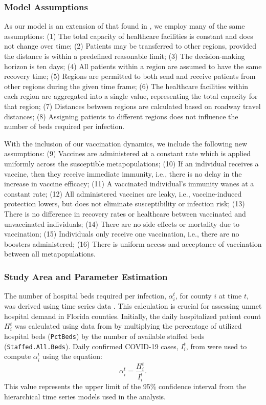 \documentclass{article}
\begin{document}
\subsubsection{Model Assumptions}
As our model is an extension of that found in \textcite{abazari2024allocation}, we employ many of the same assumptions: (1) The total capacity of healthcare facilities is constant and does not change over time; (2) Patients may be transferred to other regions, provided the distance is within a predefined reasonable limit; (3) The decision-making horizon is ten days; (4) All patients within a region are assumed to have the same recovery time; (5) Regions are permitted to both send and receive patients from other regions during the given time frame; (6) The healthcare facilities within each region are aggregated into a single value, representing the total capacity for that region; (7) Distances between regions are calculated based on roadway travel distances; (8) Assigning patients to different regions does not influence the number of beds required per infection.

With the inclusion of our vaccination dynamics, we include the following new assumptions: (9) Vaccines are administered at a constant rate which is applied uniformly across the susceptible metapopulations; (10) If an individual receives a vaccine, then they receive immediate immunity, i.e., there is no delay in the increase in vaccine efficacy; (11) A vaccinated individual's immunity wanes at a constant rate; (12) All administered vaccines are leaky, i.e., vaccine-induced protection lowers, but does not eliminate susceptibility or infection risk; (13) There is no difference in recovery rates or healthcare between vaccinated and unvaccinated individuals; (14) There are no side effects or mortality due to vaccination; (15) Individuals only receive one vaccination, i.e., there are no boosters administered; (16) There is uniform access and acceptance of vaccination between all metapopulations. 



\subsubsection{Study Area and Parameter Estimation}
The number of hospital beds required per infection, $\alpha_i^t$, for county $i$ at time $t$, was derived using time series data \parencite{abazari2024allocation}. This calculation is crucial for assessing unmet hospital demand in Florida counties. Initially, the daily hospitalized patient count $H_i^t$ was calculated using data from \textcite{covid19pvi2023} by multiplying the percentage of utilized hospital beds (\texttt{PctBeds}) by the number of available staffed beds (\texttt{Staffed.All.Beds}). Daily confirmed COVID-19 cases, $I_i^t$, from \textcite{florida_covid19_hub2023} were used to compute $\alpha_i^t$ using the equation:
\[
    \alpha_i^t = \frac{H_i^t}{I_i^t}.
\]
This value represents the upper limit of the 95\% confidence interval from the hierarchical time series models used in the analysis.
 
\end{document}
